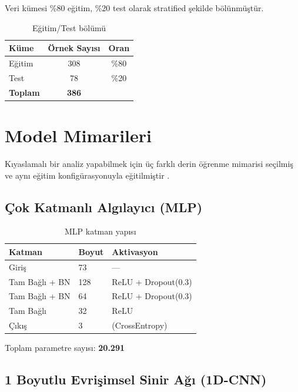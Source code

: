 \documentclass[12pt,a4paper]{article}
\begin{document}
Veri kümesi \%80 eğitim, \%20 test olarak stratified şekilde bölünmüştür.

\begin{table}[H]
\centering
\caption{Eğitim/Test bölümü}
\begin{tabular}{@{}lcc@{}}
\toprule
\textbf{Küme} & \textbf{Örnek Sayısı} & \textbf{Oran} \\
\midrule
Eğitim & 308 & \%80 \\
Test & 78 & \%20 \\
\midrule
\textbf{Toplam} & \textbf{386} & \\
\bottomrule
\end{tabular}
\end{table}

\section{Model Mimarileri}

Kıyaslamalı bir analiz yapabilmek için üç farklı derin öğrenme mimarisi seçilmiş ve aynı eğitim konfigürasyonuyla eğitilmiştir \cite{yuce_notlari}.

\subsection{Çok Katmanlı Algılayıcı (MLP)}

\begin{table}[H]
\centering
\caption{MLP katman yapısı}
\begin{tabular}{@{}lll@{}}
\toprule
\textbf{Katman} & \textbf{Boyut} & \textbf{Aktivasyon} \\
\midrule
Giriş & 73 & --- \\
Tam Bağlı + BN & 128 & ReLU + Dropout(0.3) \\
Tam Bağlı + BN & 64 & ReLU + Dropout(0.3) \\
Tam Bağlı & 32 & ReLU \\
Çıkış & 3 & (CrossEntropy) \\
\bottomrule
\end{tabular}
\end{table}

Toplam parametre sayısı: \textbf{20.291}

\subsection{1 Boyutlu Evrişimsel Sinir Ağı (1D-CNN)}
\end{document}
